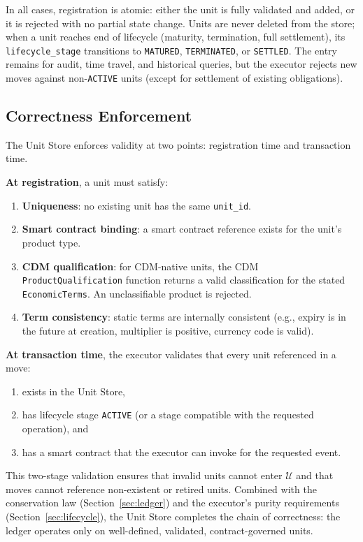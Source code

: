 \documentclass[11pt,a4paper]{article}
\begin{document}
\noindent In all cases, registration is atomic: either the unit is fully validated and added, or it is rejected with no partial state change. Units are never deleted from the store; when a unit reaches end of lifecycle (maturity, termination, full settlement), its \texttt{lifecycle\_stage} transitions to \texttt{MATURED}, \texttt{TERMINATED}, or \texttt{SETTLED}. The entry remains for audit, time travel, and historical queries, but the executor rejects new moves against non-\texttt{ACTIVE} units (except for settlement of existing obligations).

\subsection{Correctness Enforcement}
\label{sec:unit-validation}

The Unit Store enforces validity at two points: registration time and transaction time.

\medskip
\noindent\textbf{At registration}, a unit must satisfy:
\begin{enumerate}[nosep]
\item \textbf{Uniqueness}: no existing unit has the same \texttt{unit\_id}.
\item \textbf{Smart contract binding}: a smart contract reference exists for the unit's product type.
\item \textbf{CDM qualification}: for CDM-native units, the CDM \texttt{ProductQualification} function returns a valid classification for the stated \texttt{EconomicTerms}. An unclassifiable product is rejected.
\item \textbf{Term consistency}: static terms are internally consistent (e.g., expiry is in the future at creation, multiplier is positive, currency code is valid).
\end{enumerate}

\noindent\textbf{At transaction time}, the executor validates that every unit referenced in a move:
\begin{enumerate}[nosep]
\item exists in the Unit Store,
\item has lifecycle stage \texttt{ACTIVE} (or a stage compatible with the requested operation), and
\item has a smart contract that the executor can invoke for the requested event.
\end{enumerate}

\noindent This two-stage validation ensures that invalid units cannot enter $\mathcal{U}$ and that moves cannot reference non-existent or retired units. Combined with the conservation law (Section~\ref{sec:ledger}) and the executor's purity requirements (Section~\ref{sec:lifecycle}), the Unit Store completes the chain of correctness: the ledger operates only on well-defined, validated, contract-governed units.
\end{document}

